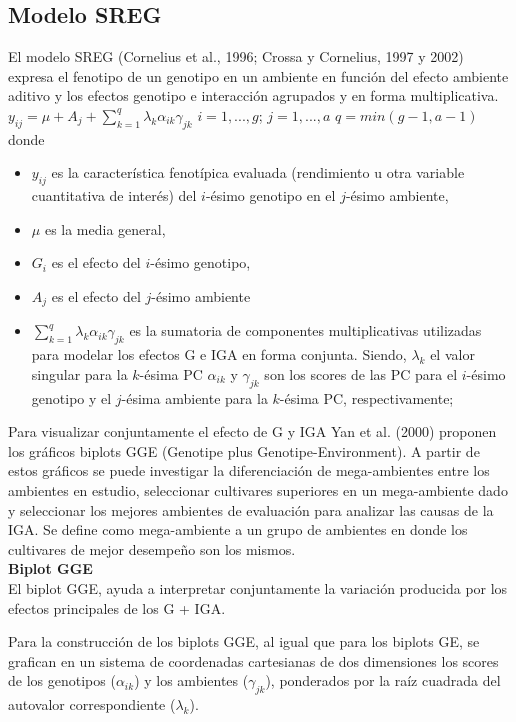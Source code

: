 \subsection{Modelo SREG}

El modelo SREG (Cornelius et al., 1996; Crossa y Cornelius, 1997 y 2002) expresa el fenotipo de un genotipo en un ambiente en función del efecto ambiente aditivo y los efectos genotipo e interacción agrupados y en forma multiplicativa.
$y_{ij}= \mu +  A_j + \sum_{k=1}^q \lambda_k \alpha_{ik} \gamma_{jk}$ \vspace{1cm} $ i=1,...,g$; $ j=1,...,a$ $q=min(g-1,a-1)$
donde 
\begin{itemize}
\item $y_{ij}$ es la característica fenotípica evaluada (rendimiento u otra variable cuantitativa de interés) del $i$-ésimo genotipo en el $j$-ésimo ambiente,
\item $\mu$ es la media general,
\item  $G_i$ es el efecto del $i$-ésimo genotipo,
\item $A_j$ es el efecto del $j$-ésimo ambiente
\item $\sum_{k=1}^q \lambda_k \alpha_{ik} \gamma_{jk}$ es la sumatoria de componentes multiplicativas utilizadas para modelar los efectos G e IGA en forma conjunta. Siendo, $\lambda_k$ el valor singular para la  $k$-ésima PC $\alpha_{ik}$ y $\gamma_{jk}$ son los scores de las PC para el $i$-ésimo genotipo y el $j$-ésima ambiente para la $k$-ésima PC, respectivamente;
\end{itemize}


Para visualizar conjuntamente el efecto de G y IGA Yan et al. (2000) proponen los gráficos biplots GGE (Genotipe plus Genotipe-Environment). A partir de estos gráficos se puede investigar la diferenciación de mega-ambientes entre los ambientes en estudio, seleccionar cultivares superiores en un mega-ambiente dado y seleccionar los mejores ambientes de evaluación para analizar las causas de la IGA. Se define como mega-ambiente a un grupo de ambientes en donde los cultivares de mejor desempeño son los mismos.\\


\textbf{Biplot GGE}\\


El biplot GGE, ayuda a interpretar conjuntamente la variación producida por los efectos principales de los G + IGA.

Para la construcción de los biplots GGE, al igual que para los biplots GE, se grafican en un sistema de coordenadas cartesianas de dos dimensiones los scores de los genotipos ($\alpha_{ik}$) y los ambientes ($\gamma_{jk}$), ponderados por la raíz cuadrada del autovalor correspondiente ($\lambda_k$).

